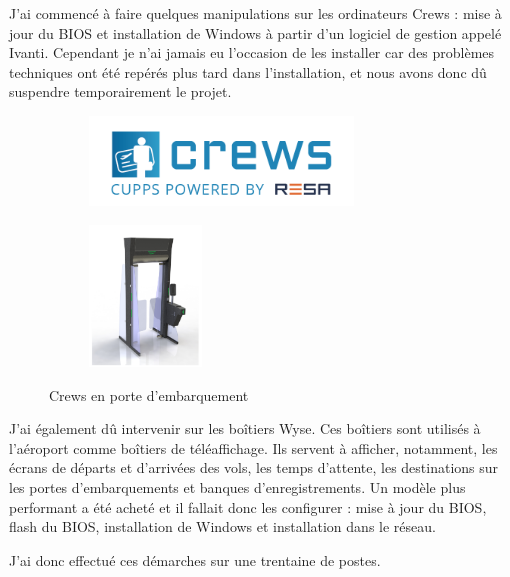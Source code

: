 J’ai commencé à faire quelques manipulations sur les ordinateurs Crews : mise à jour du BIOS et installation de Windows à partir d’un logiciel de gestion appelé Ivanti. Cependant je n’ai jamais eu l'occasion de les installer car des problèmes techniques ont été repérés plus tard dans l’installation, et nous avons donc dû suspendre temporairement le projet.

\begin{figure}[hbt!]
  \begin{subfigure}{0.5\textwidth}
    \centering
    \includegraphics[width=7cm]{Images/logocrews.png}  
    \label{fig:logocrews}
  \end{subfigure}
  \begin{subfigure}{0.5\textwidth}
    \centering
    \includegraphics[width=3cm]{Images/crews2.png}\newline  
    \label{fig:portecrews}
  \end{subfigure}
  \caption{Crews en porte d'embarquement}
\end{figure}


J’ai également dû intervenir sur les boîtiers Wyse. Ces boîtiers sont utilisés à l’aéroport comme boîtiers de téléaffichage. Ils servent à afficher, notamment, les écrans de départs et d’arrivées des vols, les temps d’attente, les destinations sur les portes d’embarquements et banques d'enregistrements. Un modèle plus performant a été acheté et il fallait donc les configurer : mise à jour du BIOS, flash du BIOS, installation de Windows et installation dans le réseau.


J’ai donc effectué ces démarches sur une trentaine de postes.\newline


